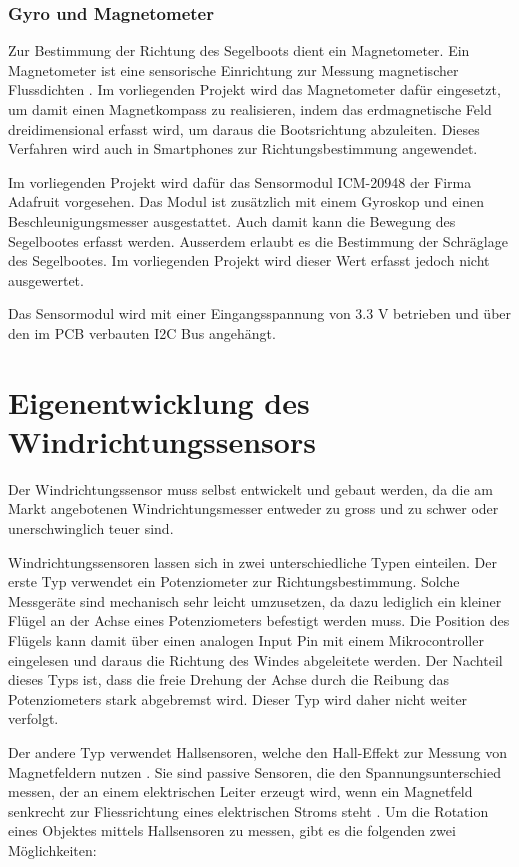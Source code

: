 \subsubsection{Gyro und Magnetometer}

Zur Bestimmung der Richtung des Segelboots dient ein Magnetometer. Ein Magnetometer ist eine sensorische Einrichtung zur Messung magnetischer Flussdichten \cite{noauthor_magnetometer_2023}. Im vorliegenden Projekt wird das Magnetometer dafür eingesetzt, um damit einen Magnetkompass zu realisieren, indem das erdmagnetische Feld dreidimensional erfasst wird, um daraus die Bootsrichtung abzuleiten. Dieses Verfahren wird auch in Smartphones zur Richtungsbestimmung angewendet.

Im vorliegenden Projekt wird dafür das Sensormodul ICM-20948 der Firma Adafruit vorgesehen. Das Modul ist zusätzlich mit einem Gyroskop und einen Beschleunigungsmesser ausgestattet. Auch damit kann die Bewegung des Segelbootes erfasst werden. Ausserdem erlaubt es die Bestimmung der Schräglage des Segelbootes. Im vorliegenden Projekt wird dieser Wert erfasst jedoch nicht ausgewertet.

Das Sensormodul wird mit einer Eingangsspannung von 3.3 V betrieben und über den im PCB verbauten I2C Bus angehängt.



\section{Eigenentwicklung des Windrichtungssensors}
Der Windrichtungssensor muss selbst entwickelt und gebaut werden, da die am Markt angebotenen Windrichtungsmesser entweder zu gross und zu schwer oder unerschwinglich teuer sind.

Windrichtungssensoren lassen sich in zwei unterschiedliche Typen einteilen. Der erste Typ verwendet ein Potenziometer zur Richtungsbestimmung. Solche Messgeräte sind mechanisch sehr leicht umzusetzen, da dazu lediglich ein kleiner Flügel an der Achse eines Potenziometers befestigt werden muss. Die Position des Flügels kann damit über einen analogen Input Pin mit einem Mikrocontroller eingelesen und daraus die Richtung des Windes abgeleitete werden. Der Nachteil dieses Typs ist, dass die freie Drehung der Achse durch die Reibung das Potenziometers stark abgebremst wird. Dieser Typ wird daher nicht weiter verfolgt.

Der andere Typ verwendet Hallsensoren, welche den Hall-Effekt zur Messung von 
Magnetfeldern nutzen \cite{noauthor_hall-sensor_2023}. Sie sind passive Sensoren, die den Spannungsunterschied messen, der an einem elektrischen Leiter erzeugt wird, wenn ein Magnetfeld senkrecht zur Fliessrichtung eines elektrischen Stroms steht \cite{noauthor_alles_nodate}. Um die Rotation eines Objektes mittels Hallsensoren zu messen, gibt es die folgenden zwei Möglichkeiten:

